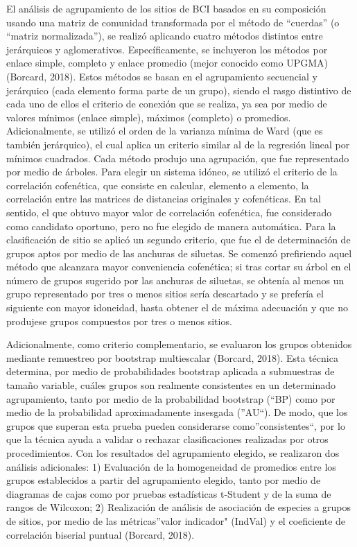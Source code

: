 \documentclass[11pt,]{article}
\begin{document}
El análisis de agrupamiento de los sitios de BCI basados en su
composición usando una matriz de comunidad transformada por el método de
``cuerdas'' (o ``matriz normalizada''), se realizó aplicando cuatro
métodos distintos entre jerárquicos y aglomerativos. Específicamente, se
incluyeron los métodos por enlace simple, completo y enlace promedio
(mejor conocido como UPGMA) (Borcard, 2018). Estos métodos se basan en
el agrupamiento secuencial y jerárquico (cada elemento forma parte de un
grupo), siendo el rasgo distintivo de cada uno de ellos el criterio de
conexión que se realiza, ya sea por medio de valores mínimos (enlace
simple), máximos (completo) o promedios. Adicionalmente, se utilizó el
orden de la varianza mínima de Ward (que es también jerárquico), el cual
aplica un criterio similar al de la regresión lineal por mínimos
cuadrados. Cada método produjo una agrupación, que fue representado por
medio de árboles. Para elegir un sistema idóneo, se utilizó el criterio
de la correlación cofenética, que consiste en calcular, elemento a
elemento, la correlación entre las matrices de distancias originales y
cofenéticas. En tal sentido, el que obtuvo mayor valor de correlación
cofenética, fue considerado como candidato oportuno, pero no fue elegido
de manera automática. Para la clasificación de sitio se aplicó un
segundo criterio, que fue el de determinación de grupos aptos por medio
de las anchuras de siluetas. Se comenzó prefiriendo aquel método que
alcanzara mayor conveniencia cofenética; si tras cortar su árbol en el
número de grupos sugerido por las anchuras de siluetas, se obtenía al
menos un grupo representado por tres o menos sitios sería descartado y
se prefería el siguiente con mayor idoneidad, hasta obtener el de máxima
adecuación y que no produjese grupos compuestos por tres o menos sitios.

Adicionalmente, como criterio complementario, se evaluaron los grupos
obtenidos mediante remuestreo por bootstrap multiescalar (Borcard,
2018). Esta técnica determina, por medio de probabilidades bootstrap
aplicada a submuestras de tamaño variable, cuáles grupos son realmente
consistentes en un determinado agrupamiento, tanto por medio de la
probabilidad bootstrap (``BP) como por medio de la probabilidad
aproximadamente insesgada (''AU``). De modo, que los grupos que superan
esta prueba pueden considerarse como''consistentes``, por lo que la
técnica ayuda a validar o rechazar clasificaciones realizadas por otros
procedimientos. Con los resultados del agrupamiento elegido, se
realizaron dos análisis adicionales: 1) Evaluación de la homogeneidad de
promedios entre los grupos establecidos a partir del agrupamiento
elegido, tanto por medio de diagramas de cajas como por pruebas
estadísticas t-Student y de la suma de rangos de Wilcoxon; 2)
Realización de análisis de asociación de especies a grupos de sitios,
por medio de las métricas''valor indicador" (IndVal) y el coeficiente de
correlación biserial puntual (Borcard, 2018).
\end{document}
